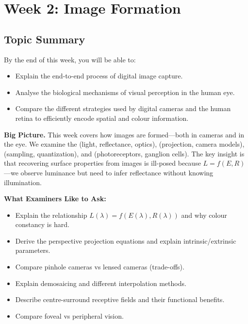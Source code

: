 \section{Week 2: Image Formation}

\subsection{Topic Summary}

\begin{keybox}
By the end of this week, you will be able to:
\begin{itemize}
  \item Explain the end-to-end process of digital image capture.
  \item Analyse the biological mechanisms of visual perception in the human eye.
  \item Compare the different strategies used by digital cameras and the human retina to efficiently encode spatial and colour information.
\end{itemize}
\end{keybox}

\textbf{Big Picture.}
This week covers how images are formed---both in cameras and in the eye. We examine the  (light, reflectance, optics),  (projection, camera models),  (sampling, quantization), and  (photoreceptors, ganglion cells). The key insight is that recovering surface properties from images is ill-posed because $L = f(E, R)$---we observe luminance but need to infer reflectance without knowing illumination.

\separator

\textbf{What Examiners Like to Ask:}
\begin{itemize}
  \item Explain the relationship $L(\lambda) = f(E(\lambda), R(\lambda))$ and why colour constancy is hard.
  \item Derive the perspective projection equations and explain intrinsic/extrinsic parameters.
  \item Compare pinhole cameras vs lensed cameras (trade-offs).
  \item Explain demosaicing and different interpolation methods.
  \item Describe centre-surround receptive fields and their functional benefits.
  \item Compare foveal vs peripheral vision.
\end{itemize}

